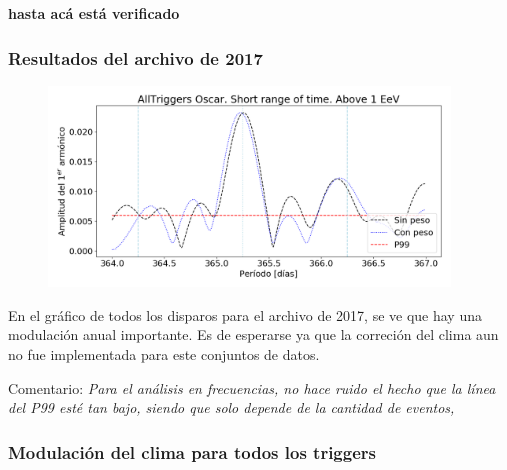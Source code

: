 {\bf hasta acá está verificado}
			\subsubsection{Resultados del archivo de 2017}

				\begin{figure}[H]
					\centering
					\includegraphics[width=0.95\textwidth]{../Anisotropia/AllTriggers/AllTriggers_2017_Short_range_Above_1_EeV.png}
				\end{figure}
			En el gráfico de todos los disparos para el archivo de 2017, se ve que hay una modulación anual importante. Es de esperarse ya que la correción del clima aun no fue implementada para este conjuntos de datos.

			Comentario: {\sl Para el análisis en frecuencias, no hace ruido el hecho que la línea del P99 esté tan bajo, siendo que solo depende de la cantidad de eventos, }





			\subsubsection{Modulación del clima para todos los triggers}




